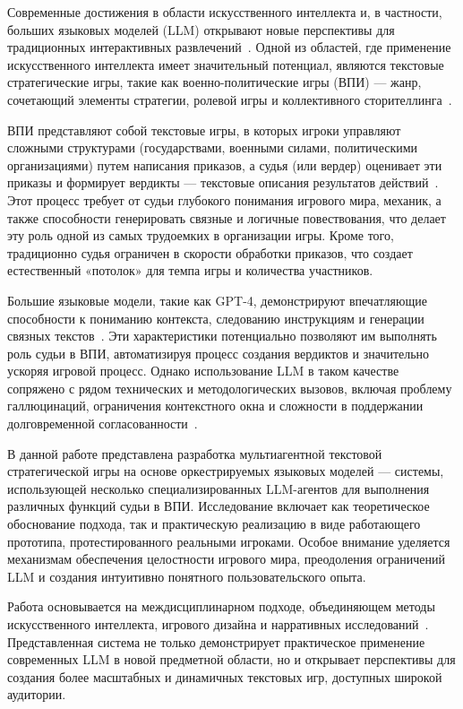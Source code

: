 Современные достижения в области искусственного интеллекта и, в частности, больших языковых моделей (LLM) открывают новые перспективы для традиционных интерактивных развлечений~\cite{brown2020language, ouyang2022training}. Одной из областей, где применение искусственного интеллекта имеет значительный потенциал, являются текстовые стратегические игры, такие как военно-политические игры (ВПИ) — жанр, сочетающий элементы стратегии, ролевой игры и коллективного сторителлинга~\cite{catalogwpg2023}.

ВПИ представляют собой текстовые игры, в которых игроки управляют сложными структурами (государствами, военными силами, политическими организациями) путем написания приказов, а судья (или вердер) оценивает эти приказы и формирует вердикты — текстовые описания результатов действий~\cite{wpg-definition}. Этот процесс требует от судьи глубокого понимания игрового мира, механик, а также способности генерировать связные и логичные повествования, что делает эту роль одной из самых трудоемких в организации игры. Кроме того, традиционно судья ограничен в скорости обработки приказов, что создает естественный «потолок» для темпа игры и количества участников.

Большие языковые модели, такие как GPT-4, демонстрируют впечатляющие способности к пониманию контекста, следованию инструкциям и генерации связных текстов~\cite{openai2023gpt4}. Эти характеристики потенциально позволяют им выполнять роль судьи в ВПИ, автоматизируя процесс создания вердиктов и значительно ускоряя игровой процесс. Однако использование LLM в таком качестве сопряжено с рядом технических и методологических вызовов, включая проблему галлюцинаций, ограничения контекстного окна и сложности в поддержании долговременной согласованности~\cite{bubeck2023sparks, liu2023evaluating}.

В данной работе представлена разработка мультиагентной текстовой стратегической игры на основе оркестрируемых языковых моделей — системы, использующей несколько специализированных LLM-агентов для выполнения различных функций судьи в ВПИ. Исследование включает как теоретическое обоснование подхода, так и практическую реализацию в виде работающего прототипа, протестированного реальными игроками. Особое внимание уделяется механизмам обеспечения целостности игрового мира, преодоления ограничений LLM и создания интуитивно понятного пользовательского опыта.

Работа основывается на междисциплинарном подходе, объединяющем методы искусственного интеллекта, игрового дизайна и нарративных исследований~\cite{yuan2022wordcraft, park2023generative}. Представленная система не только демонстрирует практическое применение современных LLM в новой предметной области, но и открывает перспективы для создания более масштабных и динамичных текстовых игр, доступных широкой аудитории.
